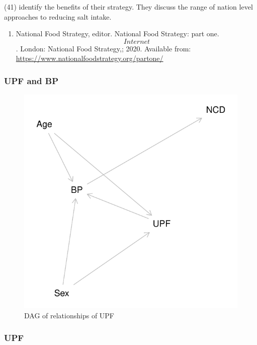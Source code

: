 \documentclass[
]{article}
\providecommand{\tightlist}{%
  \setlength{\itemsep}{0pt}\setlength{\parskip}{0pt}}
\begin{document}
(41) identify the benefits of their strategy. They discuss the range of
nation level approaches to reducing salt intake.

\begin{enumerate}
\def\labelenumi{\arabic{enumi}.}
\setcounter{enumi}{5}
\tightlist
\item
  National Food Strategy, editor. National Food Strategy: part one.
  \[Internet\]. London: National Food Strategy,; 2020. Available from:
  \url{https://www.nationalfoodstrategy.org/partone/}
\end{enumerate}

\hypertarget{upf-and-bp}{%
\subsubsection{UPF and BP}\label{upf-and-bp}}

\begin{figure}
\centering
\includegraphics{nextlevel_files/figure-latex/fig-dag-upf-1.pdf}
\caption{DAG of relationships of UPF}
\end{figure}

\hypertarget{upf}{%
\subsubsection{UPF}\label{upf}}
\end{document}
